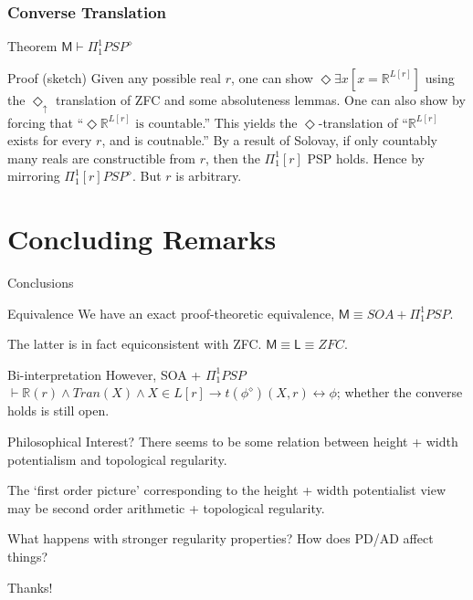 \documentclass{beamer}
\begin{document}
\begin{frame}
    \frametitle{Converse Translation}
\begin{block}{Theorem}
$\mathsf{M} \vdash \Pi_1^1 PSP^\diamond$
\end{block}
\begin{block}{Proof (sketch)}
     Given any possible real $r$, one can show $\Diamond \exists x[ x = \mathbb{R}^{L[r]}]$
    using the $\Diamond_\uparrow$ translation of ZFC and some absoluteness lemmas. 
     One can also show by forcing that ``$\Diamond \mathbb{R}^{L[r]} \text{ is countable}$.''
     This yields the $\Diamond$-translation of ``$\mathbb{R}^{L[r]}$ exists for every $r$, and is coutnable.''
     By a result of Solovay, if only countably many reals are constructible 
    from $r$, then the $\Pi_1^1[r]$ PSP holds.
     Hence by mirroring $\Pi_1^1[r] PSP^\diamond$.
     But $r$ is arbitrary.
    
\end{block}
\end{frame}
\section{Concluding Remarks}
\begin{frame}{Conclusions}
    \begin{block}{Equivalence}
        We have an exact proof-theoretic equivalence, $\mathsf{M} \equiv SOA + \Pi_1^1 PSP$.

         The latter is in fact equiconsistent with ZFC. $\mathsf{M} \equiv \mathsf{L} \equiv ZFC$.
    \end{block}
    \begin{block}{Bi-interpretation}
        However, SOA + $\Pi_1^1 PSP$ $\vdash \mathbb{R}(r) \wedge Tran(X) \wedge X \in L[r] \rightarrow t(\phi^\diamond)(X, r) \leftrightarrow \phi$; 
        whether the converse holds is still open.
    \end{block}
    \begin{block}{Philosophical Interest?}
        There seems to be some relation between height + width potentialism 
        and topological regularity.

         The `first order picture' corresponding to the height + width 
        potentialist view may be second order arithmetic + topological regularity.

         What happens with stronger regularity properties? How does 
        PD/AD affect things?
    \end{block}
\end{frame}

\begin{frame}
\Huge{\centerline{Thanks!}}
\end{frame}
\end{document}
